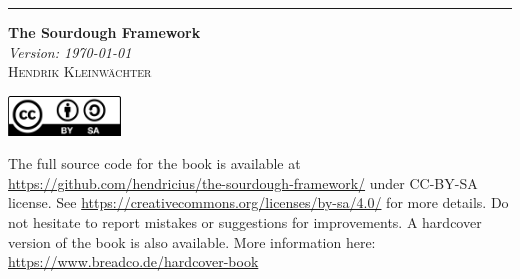 \rule{1pt}{\textheight} %
\hspace{0.05\textwidth}
\parbox[b]{0.75\textwidth}{%
{\Huge\bfseries The Sourdough Framework}\\[2\baselineskip] %
{\large\textit{Version: \today}}\\[4\baselineskip]
{\Large\textsc{Hendrik Kleinwächter}} %

\vspace{0.5\textheight}


{\noindent
\begin{flushleft}
    \includegraphics[width=3cm]{cover/CC-BY-SA}

The full source code for the book is available at
\url{https://github.com/hendricius/the-sourdough-framework/} under CC-BY-SA
license.
See \url{https://creativecommons.org/licenses/by-sa/4.0/} for more details.
Do not hesitate to report mistakes or sug\-gestions for
improvements. A hardcover version of the book is also available. More
information here: \url{https://www.breadco.de/hardcover-book}
\end{flushleft}
}\\[\baselineskip]
}

